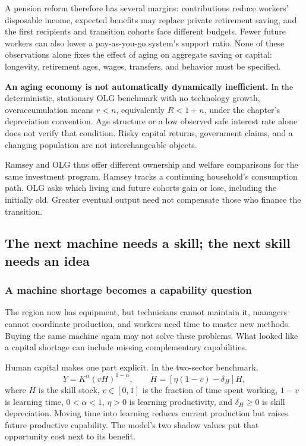 A pension reform therefore has several margins: contributions reduce
workers' disposable income, expected benefits may replace private retirement
saving, and the first recipients and transition cohorts face different
budgets. Fewer future workers can also lower a pay-as-you-go system's
support ratio. None of these observations alone fixes the effect of aging
on aggregate saving or capital: longevity, retirement ages, wages, transfers,
and behavior must be specified.

\begin{blueblock}
\textbf{An aging economy is not automatically dynamically inefficient.}
In the deterministic, stationary OLG benchmark with no technology growth,
overaccumulation means $r<n$, equivalently $R<1+n$, under the chapter's
depreciation convention. Age structure or a low observed safe interest rate
alone does not verify that condition. Risky capital returns, government
claims, and a changing population are not interchangeable objects.
\end{blueblock}

Ramsey and OLG thus offer different ownership and welfare comparisons for
the same investment program. Ramsey tracks a continuing household's
consumption path. OLG asks which living and future cohorts gain or lose,
including the initially old. Greater eventual output need not compensate
those who finance the transition.

\subsection{The next machine needs a skill; the next skill needs an idea}

\subsubsection{A machine shortage becomes a capability question}

The region now has equipment, but technicians cannot maintain it, managers
cannot coordinate production, and workers need time to master new methods.
Buying the same machine again may not solve these problems. What looked
like a capital shortage can include missing complementary capabilities.

Human capital makes one part explicit. In the two-sector benchmark,
\[
Y=K^\alpha(vH)^{1-\alpha},\qquad
\dot H=[\eta(1-v)-\delta_H]H,
\]
where $H$ is the skill stock, $v\in[0,1]$ is the fraction of time spent
working, $1-v$ is learning time, $0<\alpha<1$, $\eta>0$ is learning
productivity, and $\delta_H\geq0$ is skill depreciation. Moving time into
learning reduces current production but raises future productive capability.
The model's two shadow values put that opportunity cost next to its benefit.

